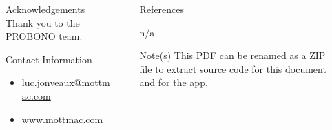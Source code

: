 \documentclass[final]{beamer}
\newlength{\sepmargin}
\newlength{\sepwid}
\newlength{\onecolwid}
\begin{document}
\begin{frame}[t]
      \begin{columns}[t] %
      
      \begin{column}{\sepmargin} \end{column}
        \begin{column}{\onecolwid} %
			\begin{block}{\large Acknowledgements}
                    Thank you to the PROBONO team.
				\end{block}	
                \vspace*{-0.9cm}
				\begin{alertblock}{\large Contact Information}
                \vspace*{-0.5cm}
					\begin{footnotesize}
					\begin{itemize}
						\item \href{mailto:luc.jonveaux@mottmac.com}{luc.jonveaux@mottmac.com}
						\item \href{http://www.mottmac.com/}{www.mottmac.com}
					\end{itemize}
					\end{footnotesize}	
					
				\end{alertblock}
		    \end{column} %
			\begin{column}{\sepwid}\end{column} %
			\begin{column}{\onecolwid} %
              \begin{block}{\large References}
              	\nocite{*} %
					
						n/a
      
				\end{block} 
    \begin{block}{\large Note(s)}
              	\nocite{*} %
						This PDF can be renamed as a ZIP file to extract source code for this document and for the app.
				\end{block} 
			\end{column} %
            

\end{columns}
\end{frame}
\end{document}
